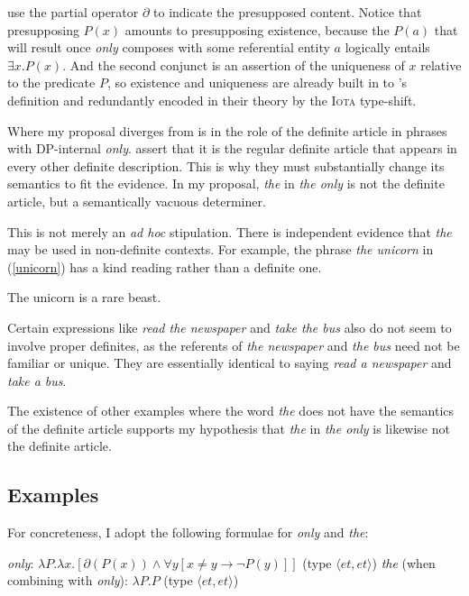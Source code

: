 \citeauthor{cb2015} use the partial operator $\partial$ to indicate the presupposed content. Notice that presupposing $P(x)$ amounts to presupposing existence, because the $P(a)$ that will result once \textit{only} composes with some referential entity $a$ logically entails $\exists x . P(x)$. And the second conjunct is an assertion of the uniqueness of $x$ relative to the predicate $P$, so existence and uniqueness are already built in to \citeauthor{cb2015}'s definition and redundantly encoded in their theory by the \textsc{Iota} type-shift.

Where my proposal diverges from  is in the role of the definite article in phrases with DP-internal \textit{only}. \citeauthor{cb2015} assert that it is the regular definite article that appears in every other definite description. This is why they must substantially change its semantics to fit the evidence. In my proposal, \textit{the} in \textit{the only} is not the definite article, but a semantically vacuous determiner.

This is not merely an \textit{ad hoc} stipulation. There is independent evidence that \textit{the} may be used in non-definite contexts. For example, the phrase \textit{the unicorn} in (\ref{unicorn}) has a kind reading rather than a definite one.

\begin{exe}
	\ex \label{unicorn} The unicorn is a rare beast.
\end{exe}

Certain expressions like \textit{read the newspaper} and \textit{take the bus} also do not seem to involve proper definites, as the referents of \textit{the newspaper} and \textit{the bus} need not be familiar or unique. They are essentially identical to saying \textit{read a newspaper} and \textit{take a bus}.

The existence of other examples where the word \textit{the} does not have the semantics of the definite article supports my hypothesis that \textit{the} in \textit{the only} is likewise not the definite article.

\subsection{Examples}
For concreteness, I adopt the following formulae for \textit{only} and \textit{the}:

\begin{exe}
	\ex \label{only-lf} \textit{only}: $ \lambda P . \lambda x . [ \partial(P(x)) \land \forall y [ x \ne y \to \neg P(y) ] ] $ (type $\langle et, et \rangle$)
	\ex \textit{the} (when combining with \textit{only}): $\lambda P . P$ (type $\langle et, et \rangle$)
\end{exe}

